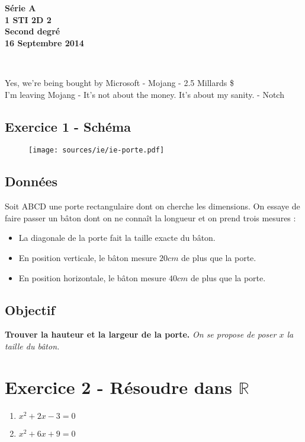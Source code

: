 \documentclass[11pt]{article}
\begin{document}

\begin{minipage}[t]{\textwidth}
  \raggedright
      {\bfseries Série A}\\[.35ex]
      {\bfseries 1 STI 2D 2}\\[.35ex]
      \vspace*{-1cm}
      \raggedleft
          {\bfseries Second degré}\\[.35ex]
          {\bfseries 16 Septembre 2014}\\[.35ex]
\end{minipage}\\[1em]

\begin{center}
  \textsf{Yes, we’re being bought by Microsoft - Mojang - 2.5 Millards \$}\\
  \textsf{I’m leaving Mojang - It’s not about the money. It’s about my sanity. - Notch}
\end{center}



\setlength{\columnseprule}{1pt}
\begin{multicols}{2}
  \subsection*{Exercice 1 - Schéma}
  \begin{figure}[H]
    \centering
    \texttt{[image: sources/ie/ie-porte.pdf]}
  \end{figure}
  \subsection*{Données}
  Soit ABCD une porte rectangulaire dont on cherche les dimensions. On essaye de faire passer un bâton dont on ne connaît la longueur et on prend trois mesures : 
  \begin{itemize}
  \item La diagonale de la porte fait la taille exacte du bâton.
  \item En position verticale, le bâton mesure $20cm$ de plus que la porte.
  \item En position horizontale, le bâton mesure $40cm$ de plus que la porte.
  \end{itemize}

  \subsection*{Objectif}
  \textbf{Trouver la hauteur et la largeur de la porte.}
  \textit{On se propose de poser $x$ la taille du bâton.}
\end{multicols}

\section*{Exercice 2 - Résoudre dans $\mathbb{R}$ }
\begin{multicols}{2}
  \begin{enumerate}
  \item $x^2 + 2x - 3 = 0$
  \item $x^2 + 6x + 9 = 0$
  \end{enumerate}
\end{multicols}
\end{document}
